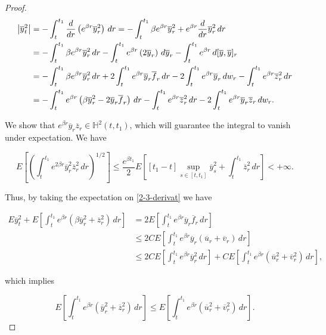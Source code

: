 \begin{theorem}
\begin{proof}
        \begin{equation}\label{2-3-derivat}
            \begin{aligned}
                \abs{\overline{y}_t^2} & = -\int_t^{t_1} \frac{d}{dr}\left(e^{\beta r}\overline{y}_r^2\right) \,dr = - \int_t^{t_1} \beta e^{\beta r}\overline{y}_r^2 + e^{\beta r}\frac{d}{dr}\overline{y}_r^2 \,dr\\
                & = - \int_t^{t_1} \beta e^{\beta r}\overline{y}_r^2 \,dr - \int_t^{t_1} e^{\beta r}\left(2\overline{y}_r\right)\,d\overline{y}_r - \int_t^{t_1} e^{\beta r}\,d[\overline{y},\overline{y}]_r \\
                & = - \int_t^{t_1} \beta e^{\beta r}\overline{y}_r^2 \,dr + 2\int_t^{t_1} e^{\beta r}\overline{y}_r\overline{f}_r\,dr - 2\int_t^{t_1} e^{\beta r}\overline{y}_r\,dw_r - \int_t^{t_1} e^{\beta r}\overline{z}_r^2\,dr \\
                & = - \int_t^{t_1} e^{\beta r}\left(\beta\overline{y}_r^2-2\overline{y}_r\overline{f}_r\right)\,dr - \int_t^{t_1}e^{\beta r}\overline{z}_r^2\,dr - 2\int_t^{t_1}e^{\beta r}\overline{y}_r\overline{z}_r\,dw_r.
            \end{aligned}
        \end{equation}
        
        We show that $e^{\beta r}\overline{y}_r\overline{z}_r\in\mathbb{H}^2(t,t_1)$, which will guarantee the integral to vanish under expectation. We have

        \[E\left[\left(\int_t^{t_1} e^{2\beta r}\overline{y}_r^2\overline{z}_r^2\,dr\right)^{1/2}\right]\leq \frac{e^{\beta t_1}}{2}E\left[[t_1-t]\sup_{s\in[t,t_1]}\overline{y}_s^2 + \int_t^{t_1}\overline{z}_r^2\,dr\right] <+\infty.\]
        
        Thus, by taking the expectation on \eqref{2-3-derivat} we have
        
        \begin{align*}
            E\overline{y}_t^2 + E\left[\int_t^{t_1}e^{\beta r} \left(\beta\overline{y}_r^2+\overline{z}_r^2\right)\,dr\right] & = 2E\left[\int_t^{t_1}e^{\beta r}\overline{y}_r\overline{f}_r\,dr\right] \\
            & \leq 2CE\left[\int_t^{t_1}e^{\beta r}\overline{y}_r\left(\overline{u}_r+\overline{v}_r\right)\,dr\right] \\
            & \leq 2CE\left[\int_t^{t_1}e^{\beta r}\overline{y}_r^2\,dr\right] + CE\left[\int_t^{t_1}e^{\beta r}\left(\overline{u}_r^2+\overline{v}_r^2\right)\,dr\right], 
        \end{align*}

        which implies

        \[E\left[\int_t^{t_1}e^{\beta r} \left(\overline{y}_r^2+\overline{z}_r^2\right)\,dr\right] \leq E\left[\int_t^{t_1}e^{\beta r} \left(\overline{u}_r^2+\overline{v}_r^2\right)\,dr\right].\]
    \end{proof}
\end{theorem}

